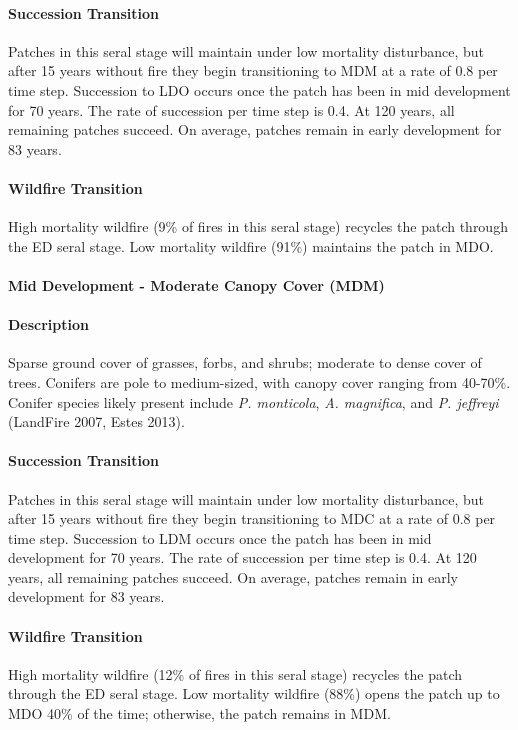 \paragraph{Succession Transition} Patches in this seral stage will maintain under low mortality disturbance, but after 15 years without fire they begin transitioning to MDM at a rate of 0.8 per time step. Succession to LDO occurs once the patch has been in mid development for 70 years. The rate of succession per time step is 0.4. At 120 years, all remaining patches succeed. On average, patches remain in early development for 83 years.

\paragraph{Wildfire Transition} High mortality wildfire (9\% of fires in this seral stage) recycles the patch through the ED seral stage. Low mortality wildfire (91\%) maintains the patch in MDO.

\noindent\hrulefill

\paragraph{Mid Development - Moderate Canopy Cover (MDM)}

\paragraph{Description} Sparse ground cover of grasses, forbs, and shrubs; moderate to dense cover of trees. Conifers are pole to medium-sized, with canopy cover ranging from 40-70\%. Conifer species likely present include \emph{P. monticola}, \emph{A. magnifica}, and \emph{P. jeffreyi} (LandFire 2007, Estes 2013).

\paragraph{Succession Transition} Patches in this seral stage will maintain under low mortality disturbance, but after 15 years without fire they begin transitioning to MDC at a rate of 0.8 per time step. Succession to LDM occurs once the patch has been in mid development for 70 years. The rate of succession per time step is 0.4. At 120 years, all remaining patches succeed. On average, patches remain in early development for 83 years.

\paragraph{Wildfire Transition} High mortality wildfire (12\% of fires in this seral stage) recycles the patch through the ED seral stage. Low mortality wildfire (88\%) opens the patch up to MDO 40\% of the time; otherwise, the patch remains in MDM.

